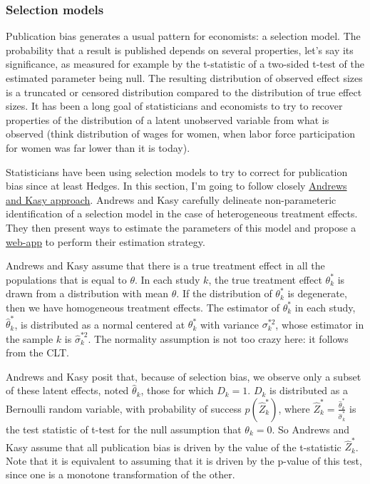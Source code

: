 \documentclass[]{book}
\theoremstyle{definition}
\theoremstyle{definition}
\theoremstyle{definition}
\theoremstyle{remark}
\begin{document}
\hypertarget{selection-models}{%
\subsubsection{Selection models}\label{selection-models}}

Publication bias generates a usual pattern for economists: a selection model.
The probability that a result is published depends on several properties, let's say its significance, as measured for example by the t-statistic of a two-sided t-test of the estimated parameter being null.
The resulting distribution of observed effect sizes is a truncated or censored distribution compared to the distribution of true effect sizes.
It has been a long goal of statisticians and economists to try to recover properties of the distribution of a latent unobserved variable from what is observed (think distribution of wages for women, when labor force participation for women was far lower than it is today).

Statisticians have been using selection models to try to correct for publication bias since at least Hedges.
In this section, I'm going to follow closely \href{https://www.aeaweb.org/articles?id=10.1257/aer.20180310}{Andrews and Kasy approach}.
Andrews and Kasy carefully delineate non-parameteric identification of a selection model in the case of heterogeneous treatment effects.
They then present ways to estimate the parameters of this model and propose a \href{https://maxkasy.github.io/home/metastudy/}{web-app} to perform their estimation strategy.

Andrews and Kasy assume that there is a true treatment effect in all the populations that is equal to \(\theta\).
In each study \(k\), the true treatment effect \(\theta^*_k\) is drawn from a distribution with mean \(\theta\).
If the distribution of \(\theta^*_k\) is degenerate, then we have homogeneous treatment effects.
The estimator of \(\theta^*_k\) in each study, \(\hat{\theta}^*_k\), is distributed as a normal centered at \(\theta^*_k\) with variance \(\sigma^{*2}_k\), whose estimator in the sample \(k\) is \(\hat{\sigma}^{*2}_k\).
The normality assumption is not too crazy here: it follows from the CLT.

Andrews and Kasy posit that, because of selection bias, we observe only a subset of these latent effects, noted \(\hat{\theta}_k\), those for which \(D_k=1\).
\(D_k\) is distributed as a Bernoulli random variable, with probability of success \(p(\hat{Z}_k^*)\), where \(\hat{Z}_k^*=\frac{\hat{\theta}^*_k}{\hat{\sigma}^{*}_k}\) is the test statistic of t-test for the null assumption that \(\theta_k=0\).
So Andrews and Kasy assume that all publication bias is driven by the value of the t-statistic \(\hat{Z}_k^*\).
Note that it is equivalent to assuming that it is driven by the p-value of this test, since one is a monotone transformation of the other.
\end{document}

